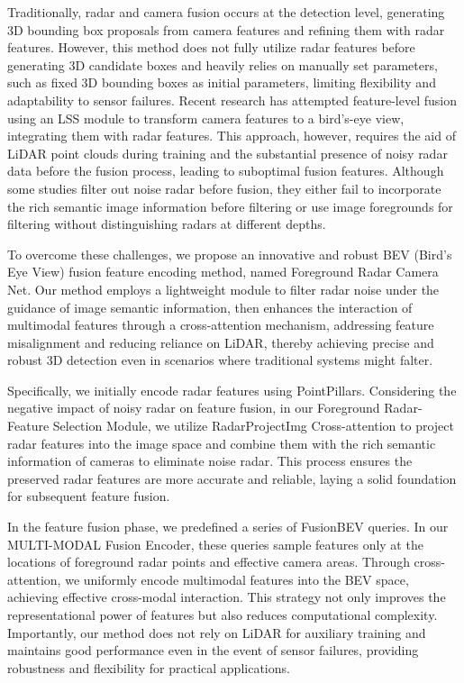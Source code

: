\documentclass{article}
\begin{document}
Traditionally, radar and camera fusion occurs at the detection level, generating 3D bounding box proposals from camera features and refining them with radar features. However, this method does not fully utilize radar features before generating 3D candidate boxes and heavily relies on manually set parameters, such as fixed 3D bounding boxes as initial parameters, limiting flexibility and adaptability to sensor failures. Recent research has attempted feature-level fusion using an LSS module to transform camera features to a bird's-eye view, integrating them with radar features. This approach, however, requires the aid of LiDAR point clouds during training and the substantial presence of noisy radar data before the fusion process, leading to suboptimal fusion features. Although some studies filter out noise radar before fusion, they either fail to incorporate the rich semantic image information before filtering or use image foregrounds for filtering without distinguishing radars at different depths. 

To overcome these challenges, we propose an innovative and robust BEV (Bird's Eye View) fusion feature encoding method, named Foreground Radar Camera Net. Our method employs a lightweight module to filter radar noise under the guidance of image semantic information, then enhances the interaction of multimodal features through a cross-attention mechanism, addressing feature misalignment and reducing reliance on LiDAR, thereby achieving precise and robust 3D detection even in scenarios where traditional systems might falter.

Specifically, we initially encode radar features using PointPillars. Considering the negative impact of noisy radar on feature fusion, in our Foreground Radar-Feature Selection Module, we utilize RadarProjectImg Cross-attention to project radar features into the image space and combine them with the rich semantic information of cameras to eliminate noise radar. This process ensures the preserved radar features are more accurate and reliable, laying a solid foundation for subsequent feature fusion.

In the feature fusion phase, we predefined a series of FusionBEV queries. In our MULTI-MODAL Fusion Encoder, these queries sample features only at the locations of foreground radar points and effective camera areas. Through cross-attention, we uniformly encode multimodal features into the BEV space, achieving effective cross-modal interaction. This strategy not only improves the representational power of features but also reduces computational complexity. Importantly, our method does not rely on LiDAR for auxiliary training and maintains good performance even in the event of sensor failures, providing robustness and flexibility for practical applications.
\end{document}
